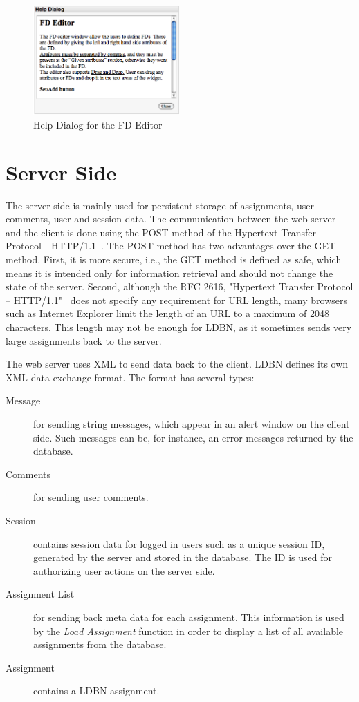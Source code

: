 \begin{figure}[h]
	\begin{center}
		\includegraphics[width=0.5\textwidth]{./img/screen-help.png}
		\caption{Help Dialog for the FD Editor}
		\label{fig:screen-help}
	\end{center}
\end{figure}


\section{Server Side}
The server side is mainly used for persistent storage of assignments, user comments,
user and session data. The communication between the web server and the client
is done using the POST method of the Hypertext Transfer Protocol - HTTP/1.1~\cite{w6}.
The POST method has two advantages over the GET method. First, it is more secure, i.e., 
the GET method is defined as safe, which means it is intended only for information 
retrieval and should not change the state of the server. Second, although the
RFC 2616, "Hypertext Transfer Protocol -- HTTP/1.1"~\cite{w6} does not specify
any requirement for URL length, many browsers such as Internet Explorer limit
the length of an URL to a maximum of 2048 characters. This length may not be 
enough for LDBN, as it sometimes sends very large assignments back to the server.  

The web server uses XML to send data back to the client. LDBN defines its own XML data
exchange format. The format has several types:

\begin{description}
	\item[Message] for sending string messages, which appear in an alert window on 
	the client side. Such messages can be, for instance, an error messages returned
	by the database. 
	\item[Comments] for sending user comments. 
	\item[Session] contains session data for logged in users such as a unique session 
	ID, generated by the server and stored in the database. The ID is used for
	authorizing user actions on the server side.
	\item[Assignment List] for sending back meta data for each assignment. This
	information is used by the \textit{Load Assignment} function in order 
	to display a list of all available assignments from the database.
	\item[Assignment] contains a LDBN assignment. 
\end{description}  


